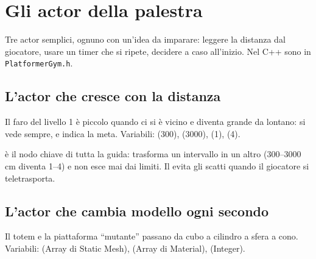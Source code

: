 \section{Gli actor della palestra}

Tre actor semplici, ognuno con un'idea da imparare: leggere la distanza dal giocatore, usare un timer che si ripete, decidere a caso all'inizio. Nel C++ sono in \texttt{PlatformerGym.h}.

\subsection{L'actor che cresce con la distanza}

Il faro del livello 1 è piccolo quando ci si è vicino e diventa grande da lontano: si vede sempre, e indica la meta. Variabili:  (300),  (3000),  (1),  (4).

\begin{bpgraph}
\end{bpgraph}

 è il nodo chiave di tutta la guida: trasforma un intervallo in un altro (300--3000\,cm diventa 1--4) e non esce mai dai limiti. Il  evita gli scatti quando il giocatore si teletrasporta.

\subsection{L'actor che cambia modello ogni secondo}

Il totem e la piattaforma ``mutante'' passano da cubo a cilindro a sfera a cono. Variabili:  (Array di Static Mesh),  (Array di Material),  (Integer).

